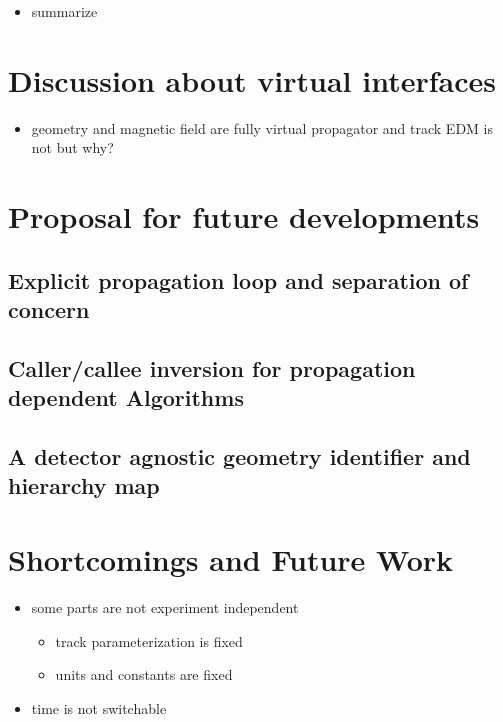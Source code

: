 \begin{itemize}
    \color{red}
    \item summarize
\end{itemize}

\section{Discussion about virtual interfaces}

\begin{itemize}
    \color{red}
    \item geometry and magnetic field are fully virtual propagator and track EDM is not but why?
\end{itemize}

\section{Proposal for future developments}

\subsection{Explicit propagation loop and separation of concern}

\subsection{Caller/callee inversion for propagation dependent Algorithms}

\subsection{A detector agnostic geometry identifier and hierarchy map}

\section{Shortcomings and Future Work}

\begin{itemize}
    \color{red}
    \item some parts are not experiment independent
    \begin{itemize}
        \item track parameterization is fixed
        \item units and constants are fixed
    \end{itemize}
    \item time is not switchable
\end{itemize}
